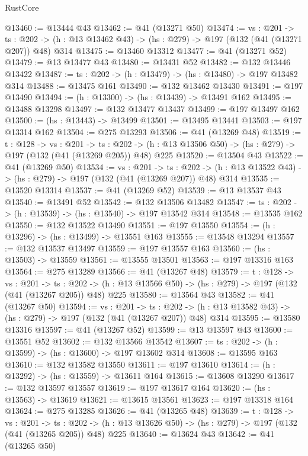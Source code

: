 \begin{lexlean}{RustCore}
\begin{coremodule}
@13460 := @13444 @43
@13462 := @41 (@13271 @50)
@13474 := {vs : @201} ->
  {ts : @202} -> (h : @13 @13462 @43) -> (hs : @279) -> @197 (@132 (@41 (@13271 @207)) @48) @314
@13475 := @13460 @13312
@13477 := @41 (@13271 @52)
@13479 := @13 @13477 @43
@13480 := @13431 @52
@13482 := @132 @13446 @13422
@13487 := {ts : @202} -> (h : @13479) -> (hs : @13480) -> @197 @13482 @314
@13488 := @13475 @161
@13490 := @132 @13462 @13430
@13491 := @197 @13490
@13494 := (h : @13300) -> (hs : @13439) -> @13491 @162
@13495 := @13488 @13298
@13497 := @132 @13477 @13437
@13499 := @197 @13497 @162
@13500 := (hs : @13443) -> @13499
@13501 := @13495 @13441
@13503 := @197 @13314 @162
@13504 := @275 @13293
@13506 := @41 (@13269 @48)
@13519 := {t : @128} ->
  {vs : @201} ->
  {ts : @202} -> (h : @13 @13506 @50) -> (hs : @279) -> @197 (@132 (@41 (@13269 @205)) @48) @225
@13520 := @13504 @43
@13522 := @41 (@13269 @50)
@13534 := {vs : @201} ->
  {ts : @202} -> (h : @13 @13522 @43) -> (hs : @279) -> @197 (@132 (@41 (@13269 @207)) @48) @314
@13535 := @13520 @13314
@13537 := @41 (@13269 @52)
@13539 := @13 @13537 @43
@13540 := @13491 @52
@13542 := @132 @13506 @13482
@13547 := {ts : @202} -> (h : @13539) -> (hs : @13540) -> @197 @13542 @314
@13548 := @13535 @162
@13550 := @132 @13522 @13490
@13551 := @197 @13550
@13554 := (h : @13296) -> (hs : @13499) -> @13551 @163
@13555 := @13548 @13294
@13557 := @132 @13537 @13497
@13559 := @197 @13557 @163
@13560 := (hs : @13503) -> @13559
@13561 := @13555 @13501
@13563 := @197 @13316 @163
@13564 := @275 @13289
@13566 := @41 (@13267 @48)
@13579 := {t : @128} ->
  {vs : @201} ->
  {ts : @202} -> (h : @13 @13566 @50) -> (hs : @279) -> @197 (@132 (@41 (@13267 @205)) @48) @225
@13580 := @13564 @43
@13582 := @41 (@13267 @50)
@13594 := {vs : @201} ->
  {ts : @202} -> (h : @13 @13582 @43) -> (hs : @279) -> @197 (@132 (@41 (@13267 @207)) @48) @314
@13595 := @13580 @13316
@13597 := @41 (@13267 @52)
@13599 := @13 @13597 @43
@13600 := @13551 @52
@13602 := @132 @13566 @13542
@13607 := {ts : @202} -> (h : @13599) -> (hs : @13600) -> @197 @13602 @314
@13608 := @13595 @163
@13610 := @132 @13582 @13550
@13611 := @197 @13610
@13614 := (h : @13292) -> (hs : @13559) -> @13611 @164
@13615 := @13608 @13290
@13617 := @132 @13597 @13557
@13619 := @197 @13617 @164
@13620 := (hs : @13563) -> @13619
@13621 := @13615 @13561
@13623 := @197 @13318 @164
@13624 := @275 @13285
@13626 := @41 (@13265 @48)
@13639 := {t : @128} ->
  {vs : @201} ->
  {ts : @202} -> (h : @13 @13626 @50) -> (hs : @279) -> @197 (@132 (@41 (@13265 @205)) @48) @225
@13640 := @13624 @43
@13642 := @41 (@13265 @50)

\end{coremodule}
\end{lexlean}
